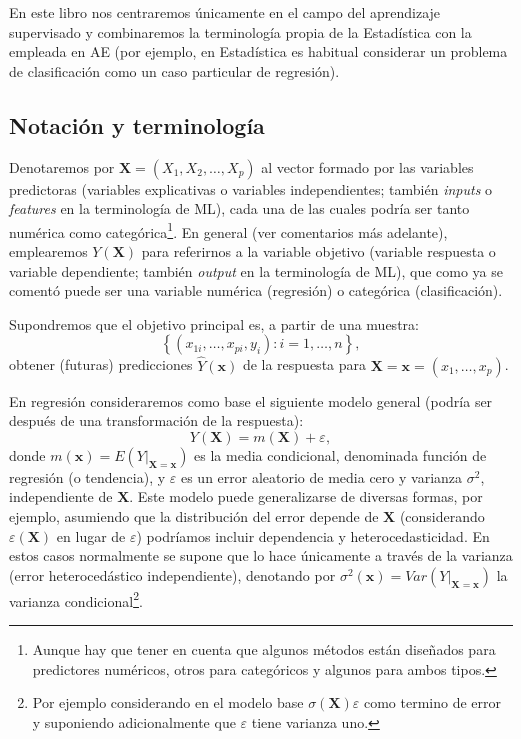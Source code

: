 \documentclass[
  spanish,
]{book}
\theoremstyle{break}
\theoremstyle{definition}
\theoremstyle{definition}
\theoremstyle{definition}
\theoremstyle{definition}
\theoremstyle{remark}
\begin{document}
En este libro nos centraremos únicamente en el campo del aprendizaje supervisado y combinaremos la terminología propia de la Estadística con la empleada en AE (por ejemplo, en Estadística es habitual considerar un problema de clasificación como un caso particular de regresión).

\hypertarget{notacion}{%
\subsection{Notación y terminología}\label{notacion}}

Denotaremos por \(\mathbf{X}=(X_1, X_2, \ldots, X_p)\) al vector formado por las variables predictoras
(variables explicativas o variables independientes; también \emph{inputs} o \emph{features} en la terminología de ML), cada una de las cuales podría ser tanto numérica como categórica\footnote{Aunque hay que tener en cuenta que algunos métodos están diseñados para predictores numéricos, otros para categóricos y algunos para ambos tipos.}.
En general (ver comentarios más adelante), emplearemos \(Y\left(\mathbf{X} \right)\) para referirnos a la variable objetivo (variable respuesta o variable dependiente; también \emph{output} en la terminología de ML), que como ya se comentó puede ser una variable numérica (regresión) o categórica (clasificación).

Supondremos que el objetivo principal es, a partir de una muestra:
\[\left\{ \left( x_{1i}, \ldots, x_{pi}, y_{i} \right)  : i = 1, \ldots, n \right\},\]
obtener (futuras) predicciones \(\hat Y\left(\mathbf{x} \right)\) de la respuesta para \(\mathbf{X}=\mathbf{x}=\left(x_{1}, \ldots, x_{p}\right)\).

En regresión consideraremos como base el siguiente modelo general (podría ser después de una transformación de la respuesta):
\begin{equation} 
  Y(\mathbf{X})=m(\mathbf{X})+\varepsilon,
  \label{eq:modelogeneral}
\end{equation}
donde \(m(\mathbf{x}) = E\left( \left. Y\right\vert_{\mathbf{X}=\mathbf{x}} \right)\) es la media condicional, denominada función de regresión (o tendencia), y \(\varepsilon\) es un error aleatorio de media cero y varianza \(\sigma^2\), independiente de \(\mathbf{X}\).
Este modelo puede generalizarse de diversas formas, por ejemplo, asumiendo que la distribución del error depende de \(\mathbf{X}\) (considerando \(\varepsilon(\mathbf{X})\) en lugar de \(\varepsilon\)) podríamos incluir dependencia y heterocedasticidad.
En estos casos normalmente se supone que lo hace únicamente a través de la varianza (error heterocedástico independiente), denotando por \(\sigma^2(\mathbf{x}) = Var\left( \left. Y\right\vert_{\mathbf{X}=\mathbf{x}} \right)\) la varianza condicional\footnote{Por ejemplo considerando en el modelo base \(\sigma(\mathbf{X})\varepsilon\) como termino de error y suponiendo adicionalmente que \(\varepsilon\) tiene varianza uno.}.
\end{document}
